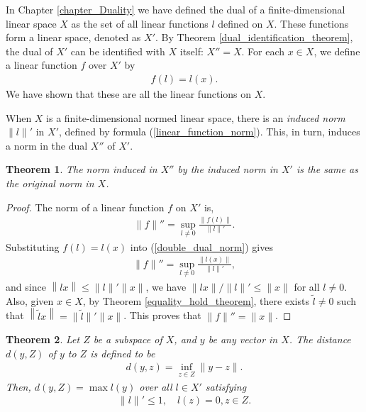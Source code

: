 \documentclass[11pt]{book}
\newtheorem{theorem}{Theorem}[chapter]
\theoremstyle{definition}
\numberwithin{equation}{chapter}
\begin{document}
\medskip

In Chapter \ref{chapter_Duality} we have defined the dual of a finite-dimensional linear space $X$ as the set of all linear functions $l$ defined on $X$. These functions form a linear space, denoted as $X'$. By Theorem \ref{dual_identification_theorem}, the dual of $X'$ can be identified with $X$ itself: $X'' = X$. For each $x \in X$, we define a linear function $f$ over $X'$ by 
\begin{align*}
    f(l) = l(x).
\end{align*}
We have shown that these are all the linear functions on $X$. 

When $X$ is a finite-dimensional normed linear space, there is an {\em induced norm} $\|l\|'$ in $X'$, defined by formula (\ref{linear_function_norm}). This, in turn, induces a norm in the dual $X''$ of $X'$.

\medskip

\begin{theorem}
The norm induced in $X''$ by the induced norm in $X'$ is the same as the original norm in $X$.
\end{theorem}
\begin{proof}
The norm of a linear function $f$ on $X'$ is, 
\begin{align}\label{double_dual_norm}
    \|f\|'' = \sup_{l \neq 0} \frac{\|f(l)\|}{\|l\|'}.
\end{align}
Substituting $f(l) = l(x)$ into (\ref{double_dual_norm}) gives
\begin{align*}
    \|f\|'' = \sup_{l \neq 0} \frac{\|l(x)\|}{\|l\|'},
\end{align*}
and since $\left\|lx\right\| \leq \|l\|' \|x\|$, we have $\|lx\|/\|l\|' \leq \|x\|$ for all $l \neq 0$. Also, given $x \in X$, by Theorem \ref{equality_hold_theorem}, there exists $\tilde{l} \neq 0$ such that $\left\|\tilde{l}x\right\| = \|\tilde{l}\|' \|x\|$. This proves that $\|f\|'' = \|x\|$.
\end{proof}

\medskip

\begin{theorem}
Let $Z$ be a subspace of $X$, and $y$ be any vector in $X$. The distance $d(y,Z)$ of $y$ to $Z$ is defined to be
\begin{align*}
    d(y,z) = \inf_{z \in Z} \|y - z\|.
\end{align*}
Then, $d(y,Z) = \max l(y)$ over all $l \in X'$ satisfying 
\begin{align*}
    \|l\|' \leq 1, \quad l(z) = 0, z \in Z.
\end{align*}
\end{theorem}
\end{document}
